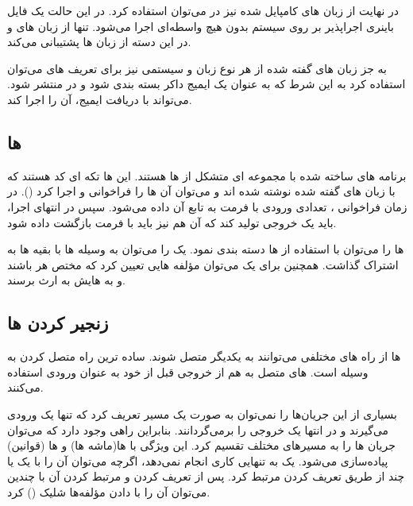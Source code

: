 در نهایت از زبان های کامپایل شده نیز در  می‌توان استفاده کرد. در این حالت یک فایل باینری اجراپذیر بر روی سیستم بدون هیچ واسطه‌ای اجرا می‌شود.  تنها از زبان های  و  در این دسته از زبان ها پشتیبانی می‌کند.

به جز زبان های گفته شده از هر نوع زبان و سیستمی نیز برای تعریف  های  می‌توان استفاده کرد به این شرط که به عنوان یک ایمیج داکر بسته بندی شود و در  منتشر شود.  می‌تواند با دریافت ایمیج، آن را اجرا کند.

\subsection{ ها}

برنامه های ساخته شده با  مجموعه ای متشکل از  ها هستند. این  ها تکه ای کد هستند که با زبان های گفته شده نوشته شده اند و می‌توان آن ها را فراخوانی و اجرا کرد (). در زمان فراخوانی ، تعدادی ورودی با فرمت  به تابع آن داده می‌شود. سپس در انتهای اجرا،  باید یک خروجی تولید کند که آن هم نیز باید با فرمت  بازگشت داده شود.

 ها را می‌توان با استفاده از  ها دسته بندی نمود. یک  را می‌توان به وسیله  ها با بقیه  ها به اشتراک گذاشت. همچنین برای یک  می‌توان مؤلفه هایی تعیین کرد که مختص هر  باشند و به  هایش به ارث برسند.

\subsection{زنجیر کردن  ها}

 ها از راه های مختلفی می‌توانند به یکدیگر متصل شوند. ساده ترین راه متصل کردن به وسیله  است.  های متصل به هم از خروجی  قبل از خود به عنوان ورودی استفاده می‌کنند.

بسیاری از این جریان‌ها را نمی‌توان به صورت یک مسیر تعریف کرد که تنها یک ورودی می‌گیرند و در انتها یک خروجی را برمی‌گردانند. بنابراین راهی وجود دارد که می‌توان جریان  ها را به مسیرهای مختلف تقسیم کرد. این ویژگی با  ها(ماشه ها) و  ها (قوانین) پیاده‌سازی می‌شود. یک  به تنهایی کاری انجام نمی‌دهد، اگرچه می‌توان آن را با یک یا چند  از طریق تعریف کردن  مرتبط کرد. پس از تعریف کردن  و مرتبط کردن آن با چندین  می‌توان آن را با دادن مؤلفه‌ها شلیک () کرد.

